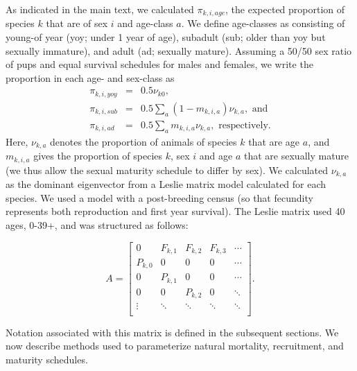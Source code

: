 \documentclass{svjour3}
\begin{document}
As indicated in the main text, we calculated $\pi_{k,i,age}$, the expected proportion of species $k$ that are of sex $i$ and age-class $a$.  We define age-classes as consisting of young-of year (yoy; under 1 year of age), subadult (sub; older than yoy but sexually immature), and adult (ad; sexually mature).  Assuming a 50/50 sex ratio of pups and equal survival schedules for males and females, we write the proportion in each age- and sex-class as
\begin{eqnarray*}
  \pi_{k,i,yoy} & = & 0.5 \nu_{k0}, \\
  \pi_{k,i,sub} & = & 0.5 \sum_a (1-m_{k,i,a})\nu_{k,a}, \text{ and} \\
  \pi_{k,i,ad} & = & 0.5 \sum_a m_{k,i,a} \nu_{k,a}, \text{ respectively.}
\end{eqnarray*}
Here, $\nu_{k,a}$ denotes the proportion of animals of species $k$ that are age $a$, and $m_{k,i,a}$ gives the proportion of species $k$, sex $i$ and age $a$ that are sexually mature (we thus allow the sexual maturity schedule to differ by sex).  We calculated $\nu_{k,a}$ as the dominant eigenvector from a Leslie matrix model \citep{Caswell2001} calculated for each species.  We used a model with a post-breeding census (so that fecundity represents both reproduction and first year survival).  The Leslie matrix used 40 ages, 0-39+, and was structured as follows:

\begin{equation*}
A=
  \begin{bmatrix}
    0 & F_{k,1} & F_{k,2}  & F_{k,3}  & \cdots \\
    P_{k,0} & 0 & 0 & 0 & \cdots \\
    0 & P_{k,1} & 0 & 0 & \cdots \\
    0 & 0  & P_{k,2} & 0 & \ddots \\
    \vdots & \ddots  & \ddots & \ddots & \ddots \\
  \end{bmatrix}.
\end{equation*}

Notation associated with this matrix is defined in the subsequent sections.
We now describe methods used to parameterize natural mortality, recruitment, and maturity schedules.
\end{document}
